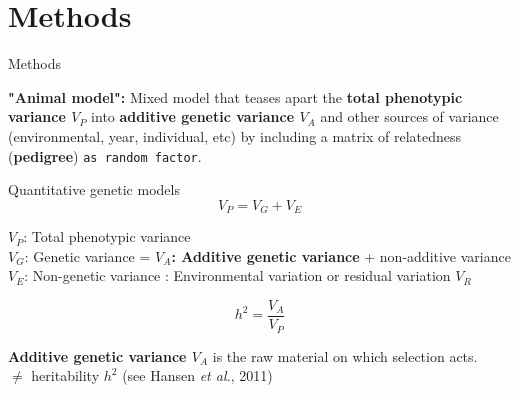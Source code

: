 \documentclass[compress]{beamer}
\begin{document}
\section{Methods}
\begin{frame}{Methods}

\raggedright
\textbf{"Animal model":} Mixed model that teases apart the \textbf{total phenotypic variance $V_P$} into \textbf{additive genetic variance $V_A$} and other sources of variance (environmental, year, individual, etc) by including a matrix of relatedness (\textbf{pedigree}) \texttt{as random factor}.\\

\vspace{0.2cm}
 \begin{exampleblock}{Quantitative genetic models}
\[ V_P=V_G + V_E\] 

\scriptsize 
$V_P$: Total phenotypic variance\\
$V_G$: Genetic variance = \textbf{$V_A$: Additive genetic variance} + non-additive variance\\
$V_E$: Non-genetic variance : Environmental variation or residual variation $V_R$\\

\small

\small
\[ h^2 = \frac{V_A}{V_P} \]

\end{exampleblock}

\textbf{Additive genetic variance $V_A$} is the raw material on which selection acts. \\$\neq$ heritability $h^2$ (see Hansen \textit{et al.}, 2011) \\
\end{frame}
\end{document}
